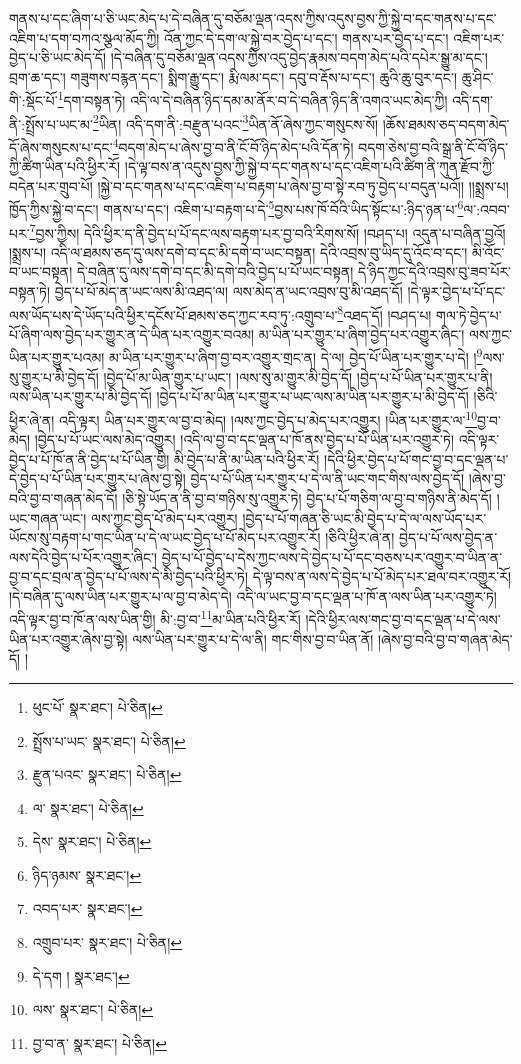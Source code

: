 གནས་པ་དང་ཞིག་པ་ཅི་ཡང་མེད་པ་དེ་བཞིན་དུ་བཅོམ་ལྡན་འདས་ཀྱིས་འདུས་བྱས་ཀྱི་སྐྱེ་བ་དང་གནས་པ་དང་འཇིག་པ་དག་བཀའ་སྩལ་མོད་ཀྱི། འོན་ཀྱང་དེ་དག་ལ་སྐྱེ་བར་བྱེད་པ་དང་། གནས་པར་བྱེད་པ་དང་། འཇིག་པར་བྱེད་པ་ཅི་ཡང་མེད་དོ། །དེ་བཞིན་དུ་བཅོམ་ལྡན་འདས་ཀྱིས་འདུ་བྱེད་རྣམས་བདག་མེད་པའི་དཔེར་སྒྱུ་མ་དང་། བྲག་ཆ་དང་། གཟུགས་བརྙན་དང་། སྨིག་རྒྱུ་དང་། རྨི་ལམ་དང་། དབུ་བ་རྡོས་པ་དང་། ཆུའི་ཆུ་བུར་དང་། ཆུ་ཤིང་གི་:སྡོང་པོ་\footnote{ཕུང་པོ་  སྣར་ཐང་།  པེ་ཅིན། }དག་བསྟན་ཏེ། འདི་ལ་དེ་བཞིན་ཉིད་དམ་མ་ནོར་བ་དེ་བཞིན་ཉིད་ནི་འགའ་ཡང་མེད་ཀྱི། འདི་དག་ནི་:སྤྲོས་པ་ཡང་མ་\footnote{སྤྲོས་པ་ཡང་  སྣར་ཐང་།  པེ་ཅིན། }ཡིན། འདི་དག་ནི་:བརྫུན་པའང་\footnote{རྫུན་པའང་  སྣར་ཐང་།  པེ་ཅིན། }ཡིན་ནོ་ཞེས་ཀྱང་གསུངས་སོ། །ཆོས་ཐམས་ཅད་བདག་མེད་དོ་ཞེས་གསུངས་པ་དང་\footnote{ལ་  སྣར་ཐང་།  པེ་ཅིན། }བདག་མེད་པ་ཞེས་བྱ་བ་ནི་ངོ་བོ་ཉིད་མེད་པའི་དོན་ཏེ། བདག་ཅེས་བྱ་བའི་སྒྲ་ནི་ངོ་བོ་ཉིད་ཀྱི་ཚིག་ཡིན་པའི་ཕྱིར་རོ། །དེ་ལྟ་བས་ན་འདུས་བྱས་ཀྱི་སྐྱེ་བ་དང་གནས་པ་དང་འཇིག་པའི་ཚིག་ནི་ཀུན་རྫོབ་ཀྱི་བདེན་པར་གྲུབ་པོ། །སྐྱེ་བ་དང་གནས་པ་དང་འཇིག་པ་བརྟག་པ་ཞེས་བྱ་བ་སྟེ་རབ་ཏུ་བྱེད་པ་བདུན་པའོ།། །།སྨྲས་པ། ཁྱོད་ཀྱིས་སྐྱེ་བ་དང་། གནས་པ་དང་། འཇིག་པ་བརྟག་པ་དེ་\footnote{དེས་  སྣར་ཐང་།  པེ་ཅིན། }བྱས་པས་ཁོ་བོའི་ཡིད་སྟོང་པ་:ཉིད་ཉན་པ་\footnote{ཉིད་ཉམས་  སྣར་ཐང་། }ལ་:འབབ་པར་\footnote{འབད་པར་  སྣར་ཐང་། }བྱས་ཀྱིས། དེའི་ཕྱིར་ད་ནི་བྱེད་པ་པོ་དང་ལས་བརྟག་པར་བྱ་བའི་རིགས་སོ། །བཤད་པ། འདུན་པ་བཞིན་བྱའོ། །སྨྲས་པ། འདི་ལ་ཐམས་ཅད་དུ་ལས་དགེ་བ་དང་མི་དགེ་བ་ཡང་བསྟན། དེའི་འབྲས་བུ་ཡིད་དུ་འོང་བ་དང་། མི་འོང་བ་ཡང་བསྟན། དེ་བཞིན་དུ་ལས་དགེ་བ་དང་མི་དགེ་བའི་བྱེད་པ་པོ་ཡང་བསྟན། དེ་ཉིད་ཀྱང་དེའི་འབྲས་བུ་ཟབ་པོར་བསྟན་ཏེ། བྱེད་པ་པོ་མེད་ན་ཡང་ལས་མི་འཐད་ལ། ལས་མེད་ན་ཡང་འབྲས་བུ་མི་འཐད་དོ། །དེ་ལྟར་བྱེད་པ་པོ་དང་ལས་ཡོད་པས་དེ་ཡོད་པའི་ཕྱིར་དངོས་པོ་ཐམས་ཅད་ཀྱང་རབ་ཏུ་:འགྲུབ་པ་\footnote{འགྲུབ་པར་  སྣར་ཐང་།  པེ་ཅིན། }འཐད་དོ། །བཤད་པ། གལ་ཏེ་བྱེད་པ་པོ་ཞིག་ལས་བྱེད་པར་གྱུར་ན་དེ་ཡིན་པར་འགྱུར་བའམ། མ་ཡིན་པར་གྱུར་པ་ཞིག་བྱེད་པར་འགྱུར་ཞིང་། ལས་ཀྱང་ཡིན་པར་གྱུར་པའམ། མ་ཡིན་པར་གྱུར་པ་ཞིག་བྱ་བར་འགྱུར་གྲང་ན། དེ་ལ། བྱེད་པོ་ཡིན་པར་གྱུར་པ་དེ། །\footnote{དེ་དག །  སྣར་ཐང་། }ལས་སུ་གྱུར་པ་མི་བྱེད་དོ། །བྱེད་པོ་མ་ཡིན་གྱུར་པ་ཡང་། །ལས་སུ་མ་གྱུར་མི་བྱེད་དོ། །བྱེད་པ་པོ་ཡིན་པར་གྱུར་པ་ནི། ལས་ཡིན་པར་གྱུར་པ་མི་བྱེད་དོ། །བྱེད་པ་པོ་མ་ཡིན་པར་གྱུར་པ་ཡང་ལས་མ་ཡིན་པར་གྱུར་པ་མི་བྱེད་དོ། །ཅིའི་ཕྱིར་ཞེ་ན། འདི་ལྟར། ཡིན་པར་གྱུར་ལ་བྱ་བ་མེད། །ལས་ཀྱང་བྱེད་པ་མེད་པར་འགྱུར། །ཡིན་པར་གྱུར་ལ་\footnote{ལས་  སྣར་ཐང་།  པེ་ཅིན། }བྱ་བ་མེད། །བྱེད་པ་པོ་ཡང་ལས་མེད་འགྱུར། །འདི་ལ་བྱ་བ་དང་ལྡན་པ་ཁོ་ནས་བྱེད་པ་པོ་ཡིན་པར་འགྱུར་ཏེ། འདི་ལྟར་བྱེད་པ་པོ་ཁོ་ན་ནི་བྱེད་པ་པོ་ཡིན་གྱི། མི་བྱེད་པ་ནི་མ་ཡིན་པའི་ཕྱིར་རོ། །དེའི་ཕྱིར་བྱེད་པ་པོ་གང་བྱ་བ་དང་ལྡན་པ་དེ་བྱེད་པ་པོ་ཡིན་པར་གྱུར་པ་ཞེས་བྱ་སྟེ། བྱེད་པ་པོ་ཡིན་པར་གྱུར་པ་དེ་ལ་ནི་ཡང་གང་གིས་ལས་བྱེད་དོ། །ཞེས་བྱ་བའི་བྱ་བ་གཞན་མེད་དོ། །ཅི་སྟེ་ཡོད་ན་ནི་བྱ་བ་གཉིས་སུ་འགྱུར་ཏེ། བྱེད་པ་པོ་གཅིག་ལ་བྱ་བ་གཉིས་ནི་མེད་དོ། །ཡང་གཞན་ཡང་། ལས་ཀྱང་བྱེད་པོ་མེད་པར་འགྱུར། །བྱེད་པ་པོ་གཞན་ཅི་ཡང་མི་བྱེད་པ་དེ་ལ་ལས་ཡོད་པར་ཡོངས་སུ་བརྟག་པ་གང་ཡིན་པ་དེ་ལ་ཡང་བྱེད་པ་པོ་མེད་པར་འགྱུར་རོ། །ཅིའི་ཕྱིར་ཞེ་ན། བྱེད་པ་པོ་ལས་བྱེད་ན་ལས་དེའི་བྱེད་པ་པོར་འགྱུར་ཞིང་། བྱེད་པ་པོ་བྱེད་པ་དེས་ཀྱང་ལས་དེ་བྱེད་པ་པོ་དང་བཅས་པར་འགྱུར་བ་ཡིན་ན་བྱ་བ་དང་བྲལ་ན་བྱེད་པ་པོ་ལས་དེ་མི་བྱེད་པའི་ཕྱིར་ཏེ། དེ་ལྟ་བས་ན་ལས་དེ་བྱེད་པ་པོ་མེད་པར་ཐལ་བར་འགྱུར་རོ། །དེ་བཞིན་དུ་ལས་ཡིན་པར་གྱུར་པ་ལ་བྱ་བ་མེད་དེ། འདི་ལ་ཡང་བྱ་བ་དང་ལྡན་པ་ཁོ་ན་ལས་ཡིན་པར་འགྱུར་ཏེ། འདི་ལྟར་བྱ་བ་ཁོ་ན་ལས་ཡིན་གྱི། མི་:བྱ་བ་\footnote{བྱ་བ་ན་  སྣར་ཐང་།  པེ་ཅིན། }མ་ཡིན་པའི་ཕྱིར་རོ། །དེའི་ཕྱིར་ལས་གང་བྱ་བ་དང་ལྡན་པ་དེ་ལས་ཡིན་པར་འགྱུར་ཞེས་བྱ་སྟེ། ལས་ཡིན་པར་གྱུར་པ་དེ་ལ་ནི། གང་གིས་བྱ་བ་ཡིན་ནོ། །ཞེས་བྱ་བའི་བྱ་བ་གཞན་མེད་དོ། །
